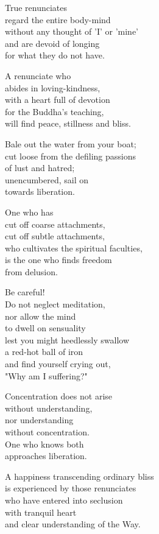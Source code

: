 True renunciates\\
regard the entire body-mind\\
without any thought of ’I’ or ’mine’\\
and are devoid of longing\\
for what they do not have.


A renunciate who\\
abides in loving-kindness,\\
with a heart full of devotion\\
for the Buddha's teaching,\\
will find peace, stillness and bliss.


Bale out the water from your boat;\\
cut loose from the defiling passions\\
of lust and hatred;\\
unencumbered, sail on\\
towards liberation.


One who has\\
cut off coarse attachments,\\
cut off subtle attachments,\\
who cultivates the spiritual faculties,\\
is the one who finds freedom\\
from delusion.


Be careful!\\
Do not neglect meditation,\\
nor allow the mind\\
to dwell on sensuality\\
lest you might heedlessly swallow\\
a red-hot ball of iron\\
and find yourself crying out,\\
"Why am I suffering?"


Concentration does not arise\\
without understanding,\\
nor understanding\\
without concentration.\\
One who knows both\\
approaches liberation.


A happiness transcending ordinary bliss\\
is experienced by those renunciates\\
who have entered into seclusion\\
with tranquil heart\\
and clear understanding of the Way.



